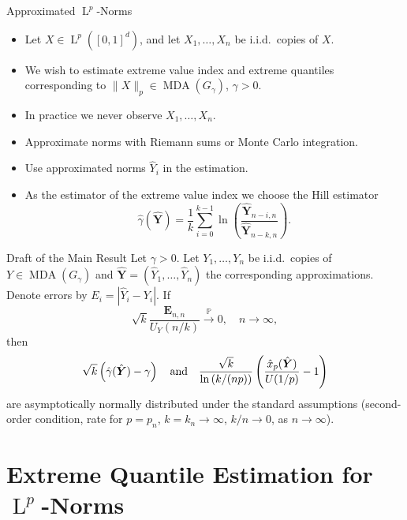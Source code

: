 \documentclass[11pt, aspectratio=169]{beamer}
\DeclareMathOperator{\mda}{MDA}
\DeclareMathOperator{\lp}{L}
\begin{document}
\begin{frame}{Approximated $\lp^p$-Norms}
  \begin{itemize}
    \item Let $X\in \lp^p\left([0, 1]^d\right)$, and let $X_1,\ldots, X_n$ be
    i.i.d.\ copies of $X$.
    \item We wish to estimate extreme value index and extreme quantiles
    corresponding to $\|X\|_p\in\mda\left(G_\gamma\right)$, $\gamma > 0$.
    \pause
    \item In practice we never observe $X_1, \ldots, X_n$.
    \pause
    \item Approximate norms with Riemann sums or Monte Carlo integration.
    \item Use approximated norms $\hat{Y}_i$ in the estimation.
    \pause
    \item As the estimator of the extreme value index we choose the Hill
    estimator
    \begin{equation*}
      \hat\gamma(\hat{\bm Y}) = \frac{1}{k}\sum_{i = 0}^{k-1}
      \ln\left(\frac{\hat{\bm Y}_{n-i,n}}{\hat{\bm Y}_{n-k,n}}\right).
    \end{equation*}
  \end{itemize}
\end{frame}


\begin{frame}{Draft of the Main Result}
  Let $\gamma > 0$. Let $Y_1, \ldots, Y_n$ be i.i.d.\ copies of
  $Y\in\mda\left(G_\gamma\right)$ and $\hat{\bm Y} = (\hat Y_1, \ldots, \hat
  Y_n)$ the corresponding approximations. Denote errors by $E_i = \left|\hat Y_i
  - Y_i\right|$. If
  \begin{equation*}
    \sqrt{k}\frac{\bm E_{n,n}}{U_Y\left(n/k\right)}\stackrel{\mathbb{P}}{\to}0,
    \quad n\to\infty,
  \end{equation*}
  then
  \begin{equation*}
    \sqrt{k}\left(\hat\gamma(\hat{\bm Y}) - \gamma\right)
    \quad\textnormal{and}\quad
    \frac{\sqrt{k}}{\ln\left(k/(np)\right)}\left(\frac{\hat x_p(\hat{\bm Y})}
    {U(1/p)} - 1\right)
  \end{equation*}
  are asymptotically normally distributed under the standard assumptions
  (second-order condition, rate for $p = p_n$, $k = k_n\to\infty$, $k/n\to 0$,
  as $n\to\infty$). 
\end{frame}

\section{Extreme Quantile Estimation for $\lp^p$-Norms}
\end{document}
